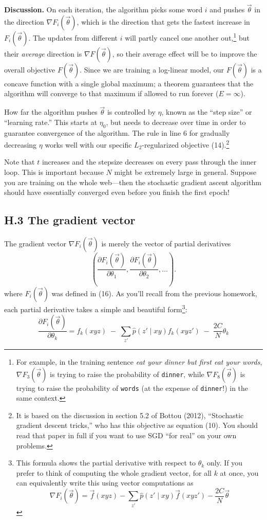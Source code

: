 \noindent \textbf{Discussion.} On each iteration, the algorithm picks some word $i$ and pushes $\vec{\theta}$ in the direction $\nabla F_i(\vec{\theta})$, which is the direction that gets the fastest increase in $F_i(\vec{\theta})$. The updates from different $i$ will partly cancel one another out,\footnote{For example, in the training sentence \textit{eat your dinner but first eat your words}, $\nabla F_3(\vec{\theta})$ is trying to raise the probability of \texttt{dinner}, while $\nabla F_8(\vec{\theta})$ is trying to raise the probability of \texttt{words} (at the expense of \texttt{dinner}!) in the same context.} but their \emph{average} direction is $\nabla F(\vec{\theta})$, so their average effect will be to improve the overall objective $F(\vec{\theta})$. Since we are training a log-linear model, our $F(\vec{\theta})$ is a concave function with a single global maximum; a theorem guarantees that the algorithm will converge to that maximum if allowed to run forever ($E = \infty$).  

How far the algorithm pushes $\vec{\theta}$ is controlled by $\eta$, known as the “step size” or “learning rate.” This starts at $\eta_0$, but needs to decrease over time in order to guarantee convergence of the algorithm. The rule in line 6 for gradually decreasing $\eta$ works well with our specific $L_2$-regularized objective (14).\footnote{It is based on the discussion in section 5.2 of Bottou (2012), ``Stochastic gradient descent tricks,'' who has this objective as equation (10). You should read that paper in full if you want to use SGD ``for real'' on your own problems.}

Note that $t$ increases and the stepsize decreases on every pass through the inner loop. This is important because $N$ might be extremely large in general. Suppose you are training on the whole web—then the stochastic gradient ascent algorithm should have essentially converged even before you finish the first epoch!  

\subsection*{H.3 The gradient vector}

The gradient vector $\nabla F_i(\vec{\theta})$ is merely the vector of partial derivatives 
\[
\left( \frac{\partial F_i(\vec{\theta})}{\partial \theta_1}, \frac{\partial F_i(\vec{\theta})}{\partial \theta_2}, \ldots \right).
\]
where $F_i(\vec{\theta})$ was defined in (16). As you’ll recall from the previous homework, each partial derivative takes a simple and beautiful form\footnote{This formula shows the partial derivative with respect to $\theta_k$ only. If you prefer to think of computing the whole gradient vector, for all $k$ at once, you can equivalently write this using vector computations as 
\[
\nabla F_i(\vec{\theta}) = \vec{f}(xyz) - \sum_{z'} \hat{p}(z' \mid xy)\vec{f}(xyz') - \frac{2C}{N}\vec{\theta}
\]}:
\begin{equation}
\frac{\partial F_i(\vec{\theta})}{\partial \theta_k} = f_k(xyz) \;-\; \sum_{z'} \hat{p}(z' \mid xy) f_k(xyz') \;-\; \frac{2C}{N}\theta_k
\end{equation}

